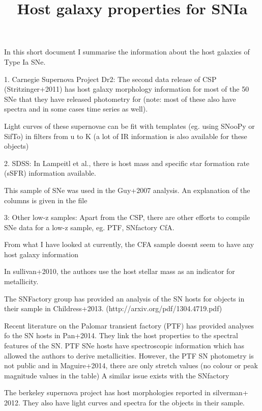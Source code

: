 \documentclass{article}
\begin{document}
\title{Host galaxy properties for SNIa}
\maketitle
In this short document I summarise the information about the host galaxies of Type Ia SNe.

1. Carnegie Supernova Project Dr2: 
The second data release of CSP (Stritzinger+2011) has host galaxy morphology information for most of the 50 SNe that they have released photometry for (note: most of these also have spectra and in some cases time series as well).

Light curves of these supernovae can be fit with templates (eg. using SNooPy or SifTo) in filters from u to K (a lot of IR information is also available for these objects)

2. SDSS:
In Lampeitl et al., there is host mass and specific star formation rate (sSFR) information available. 

This sample of SNe was used in the Guy+2007 analysis. An explanation of the columns is given in the file

3: Other low-z samples:
Apart from the CSP, there are other efforts to compile SNe data for a low-z sample, eg. PTF, SNfactory CfA. 

From what I have looked at currently, the CFA sample doesnt seem to have any host galaxy information

In sullivan+2010, the authors use the host stellar mass as an indicator for metallicity. 
 

The SNFactory group has provided an analysis of the SN hosts for objects in their sample in Childress+2013. 
(http://arxiv.org/pdf/1304.4719.pdf)

Recent literature on the Palomar transient factory (PTF) has provided analyses fo the SN hosts in Pan+2014. They link the host properties to the spectral features of the SN. 
PTF SNe hosts have spectroscopic information which has allowed the authors to derive metallicities. However, the PTF SN photometry is not public and in Maguire+2014, there are only stretch values (no colour or peak magnitude values in the table)
 A similar issue exists with the SNfactory

The berkeley supernova project has host morphologies reported in silverman+ 2012. They also have light curves and spectra for the objects in their sample.
\end{document}
